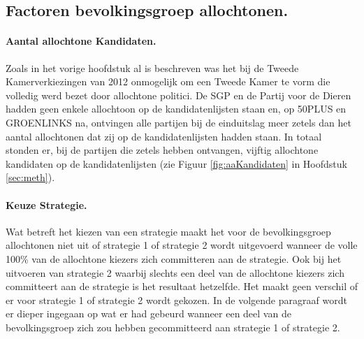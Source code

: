 \subsection{Factoren bevolkingsgroep allochtonen.}

\paragraph{Aantal allochtone Kandidaten.} 
Zoals in het vorige hoofdstuk al is beschreven was het bij de Tweede Kamerverkiezingen van 2012 onmogelijk om een Tweede Kamer te vorm die volledig werd bezet door allochtone politici. De SGP en de Partij voor de Dieren hadden geen enkele allochtoon op de kandidatenlijsten staan en, op 50PLUS en GROENLINKS na, ontvingen alle partijen bij de einduitslag meer zetels dan het aantal allochtonen dat zij op de kandidatenlijsten hadden staan. In totaal stonden er, bij de partijen die zetels hebben ontvangen, vijftig allochtone kandidaten op de kandidatenlijsten (zie Figuur \ref{fig:aaKandidaten} in Hoofdstuk \ref{sec:meth}). 

\paragraph{Keuze Strategie.}
Wat betreft het kiezen van een strategie maakt het voor de bevolkingsgroep allochtonen niet uit of strategie 1 of strategie 2 wordt uitgevoerd wanneer de volle 100\% van de allochtone kiezers zich committeren aan de strategie. Ook bij het uitvoeren van strategie 2 waarbij slechts een deel van de allochtone kiezers zich committeert aan de strategie is het resultaat hetzelfde. Het maakt geen verschil of er voor strategie 1 of strategie 2 wordt gekozen. In de volgende paragraaf wordt er dieper ingegaan op wat er had gebeurd wanneer een deel van de bevolkingsgroep zich zou hebben gecommitteerd aan strategie 1 of strategie 2.



